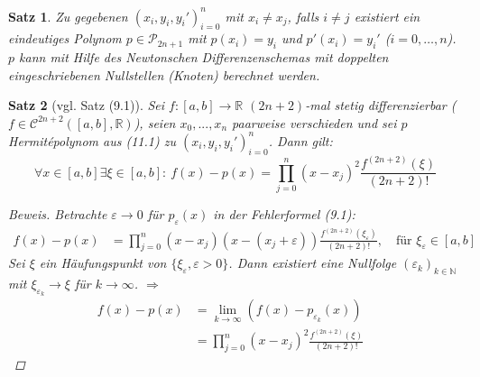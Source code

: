 \documentclass[12pt]{article}
\theoremstyle{break}
\newtheorem{theorem}{Satz}[subsection]
\begin{document}
\begin{theorem}
Zu gegebenen $(x_i, y_i, y_i')_{i=0}^n$ mit $x_i \neq x_j$, falls $i \neq j$ existiert ein eindeutiges Polynom $p \in \mathcal{P}_{2n+1}$ mit $p(x_i) = y_i$ und $p'(x_i) = y_i'$ ($i=0,\dots, n$). $p$ kann mit Hilfe des Newtonschen Differenzenschemas mit doppelten eingeschriebenen Nullstellen (Knoten) berechnet werden.
\end{theorem}

\begin{theorem}[vgl. Satz (9.1)]
Sei $f: [a,b] \rightarrow \mathbb{R}$ $(2n+2)$-mal stetig differenzierbar ($f \in \mathcal{C}^{2n+2}([a,b], \mathbb{R})$), seien $x_0,..., x_n$ paarweise verschieden und sei $p$ Hermit\'{e}polynom aus (11.1) zu $(x_i,y_i, y_i')_{i=0}^n$. Dann gilt:
\[ \forall x \in [a,b] \exists \xi \in [a,b]: \medspace f(x)-p(x) = \prod_{j=0}^n (x-x_j)^2 \frac{f^{(2n+2)} (\xi)}{(2n+2)!} \]

\begin{proof}[Beweis]
Betrachte $\varepsilon \rightarrow 0$ für $p_{\varepsilon}(x)$ in der Fehlerformel (9.1):
\begin{align*}
f(x)-p(x) &= \prod_{j=0}^n (x-x_j)(x-(x_j+\varepsilon)) \frac{f^{(2n+2)}(\xi_{\varepsilon})}{(2n+2)!}, \quad \text{für } \xi_{\varepsilon} \in [a,b]
\end{align*}
Sei $\xi$ ein Häufungspunkt von $\{\xi_{\varepsilon}, \varepsilon > 0\}$. Dann existiert eine Nullfolge $(\varepsilon_k)_{k\in \mathbb{N}}$ mit $\xi_{\varepsilon_k} \rightarrow \xi$ für $k \rightarrow \infty$. $\Rightarrow$
\begin{align*}
f(x)-p(x) &= \lim_{k \rightarrow \infty} (f(x) - p_{\varepsilon_k}(x)) &\\
&= \prod_{j=0}^n (x-x_j)^2 \frac{f^{(2n+2)}(\xi)}{(2n+2)!}
\end{align*}
\end{proof}
\end{theorem}
\end{document}
